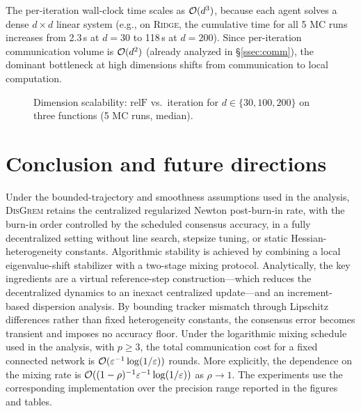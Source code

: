 \documentclass[review,onefignum,onetabnum]{siamart171218}
\begin{document}
	The per-iteration wall-clock time scales as $\mathcal{O}(d^3)$, because each
	agent solves a dense $d\times d$ linear system
	(e.g., on \textsc{Ridge}, the cumulative
	time for all 5 MC runs increases from 2.3\,s at $d{=}30$ to 118\,s at $d{=}200$).
	Since per-iteration communication volume is $\mathcal{O}(d^2)$
	(already analyzed in \S\ref{ssec:comm}), the dominant bottleneck
	at high dimensions shifts from communication to local computation.
	
	\begin{figure}[htbp]
		\centering
		\caption{Dimension scalability: $\mathrm{relF}$ vs.\ iteration for
			$d\in\{30,100,200\}$ on three functions (5 MC runs, median).}
		\label{fig:scalability}
	\end{figure}
	
	
	\section{Conclusion and future directions}\label{sec:conclusion}
	
	Under the bounded-trajectory and smoothness assumptions used in the
	analysis, \textsc{DisGrem} retains the
	centralized regularized Newton post-burn-in rate, with the burn-in
	order controlled by the scheduled consensus accuracy,
	in a fully decentralized setting without line search, stepsize tuning,
	or static Hessian-heterogeneity constants.
	Algorithmic stability is achieved by combining a local eigenvalue-shift
	stabilizer with a two-stage mixing protocol.
	Analytically, the key ingredients are a virtual reference-step
	construction---which reduces the decentralized dynamics to an inexact
	centralized update---and an increment-based dispersion analysis.
	By bounding tracker mismatch through Lipschitz differences rather than
	fixed heterogeneity constants, the consensus error becomes transient and
	imposes no accuracy floor.
	Under the logarithmic mixing schedule used in the analysis,
	with $p\ge3$, the total communication cost for a fixed connected
	network is $\mathcal{O}(\varepsilon^{-1}\log(1/\varepsilon))$ rounds.
	More explicitly, the dependence on the mixing rate is
	$\mathcal{O}((1-\rho)^{-1}\varepsilon^{-1}\log(1/\varepsilon))$ as
	$\rho\to1$.
	The experiments use the corresponding implementation over the
	precision range reported in the figures and tables.
	
\end{document}
